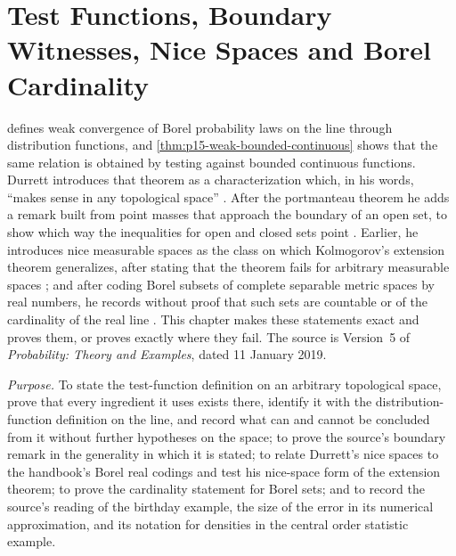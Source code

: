 \chapter{Test Functions, Boundary Witnesses, Nice Spaces and Borel Cardinality}
\label{sec:p15-w02c-p15-004-weak-test-functions}

 defines weak convergence of
Borel probability laws on the line through distribution functions,
and \cref{thm:p15-weak-bounded-continuous} shows that the same relation
is obtained by testing against bounded continuous functions. Durrett
introduces that theorem as a characterization which, in his words,
``makes sense in any topological space''
\cite[p.~119]{DurrettPTEAuthor2019}. After the portmanteau theorem he
adds a remark built from point masses that approach the boundary of an
open set, to show which way the inequalities for open and closed sets
point \cite[p.~120]{DurrettPTEAuthor2019}. Earlier, he introduces
nice measurable spaces as the class on which Kolmogorov's extension
theorem generalizes, after stating that the theorem fails for arbitrary
measurable spaces \cite[p.~53]{DurrettPTEAuthor2019}; and after coding
Borel subsets of complete separable metric spaces by real numbers, he
records without proof that such sets are countable or of the cardinality
of the real line \cite[p.~54]{DurrettPTEAuthor2019}. This chapter makes
these statements exact and proves them, or proves exactly where they
fail. The source is Version~5 of
\emph{Probability: Theory and Examples}, dated 11 January 2019.

\emph{Purpose.} To state the test-function definition on an arbitrary
topological space, prove that every ingredient it uses exists there,
identify it with the distribution-function definition on the line, and
record what can and cannot be concluded from it without further
hypotheses on the space; to prove the source's boundary remark in
the generality in which it is stated; to relate Durrett's nice spaces
to the handbook's Borel real codings and test his nice-space form of the
extension theorem; to prove the cardinality statement for Borel
sets; and to record the source's reading of the birthday example, the
size of the error in its numerical approximation, and its notation for
densities in the central order statistic example.

